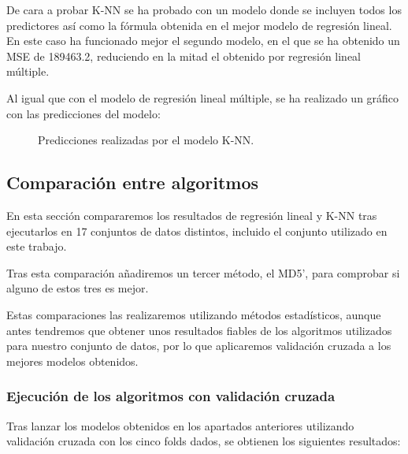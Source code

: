 De cara a probar K-NN se ha probado con un modelo donde se incluyen todos los predictores así como la fórmula obtenida en el mejor modelo de regresión lineal. En este caso ha funcionado mejor el segundo modelo, en el que se ha obtenido un MSE de 189463.2, reduciendo en la mitad el obtenido por regresión lineal múltiple.

Al igual que con el modelo de regresión lineal múltiple, se ha realizado un gráfico con las predicciones del modelo:

\begin{figure}[H]
	\centering
	
	\caption{Predicciones realizadas por el modelo K-NN.}
	\label{fig:predicciones_knn}
\end{figure}

\subsection{Comparación entre algoritmos}

En esta sección compararemos los resultados de regresión lineal y K-NN tras ejecutarlos en 17 conjuntos de datos distintos, incluido el conjunto utilizado en este trabajo.

Tras esta comparación añadiremos un tercer método, el MD5', para comprobar si alguno de estos tres es mejor.

Estas comparaciones las realizaremos utilizando métodos estadísticos, aunque antes tendremos que obtener unos resultados fiables de los algoritmos utilizados para nuestro conjunto de datos, por lo que aplicaremos validación cruzada a los mejores modelos obtenidos.

\subsubsection{Ejecución de los algoritmos con validación cruzada}

Tras lanzar los modelos obtenidos en los apartados anteriores utilizando validación cruzada con los cinco folds dados, se obtienen los siguientes resultados:

\begin{table}[H]
\centering
{}
\caption{MSE obtenido en el conjunto de entrenamiento y test para cada método.}
\end{table}

